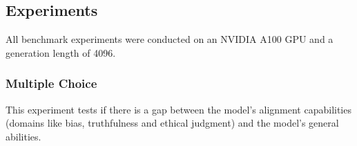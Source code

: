 \documentclass{article}
\newcommand{\yx}[1]{\textcolor{blue}{{[YX: #1]}}}
\newcommand{\ra}[1]{\textcolor{blue}{{[RA: #1]}}}
\newcommand{\hv}[1]{\textcolor{blue}{{[HV: #1]}}}
\begin{document}



\subsection{Experiments}
All benchmark experiments were conducted on an NVIDIA A100 GPU and a generation length of 4096. 

\subsubsection{Multiple Choice}
This experiment tests if there is a gap between the model's alignment capabilities (domains like bias, truthfulness and ethical judgment) and the model's general abilities.
\end{document}
